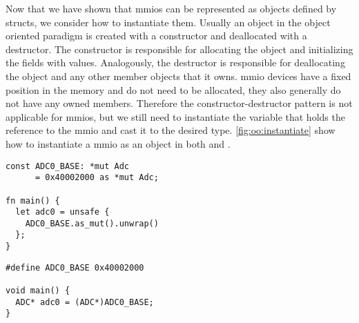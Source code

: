 Now that we have shown that \glspl{mmio} can be represented as objects defined by structs, we consider how to instantiate them.
Usually an object in the object oriented paradigm is created with a constructor and deallocated with a destructor.
The constructor is responsible for allocating the object and initializing the fields with values.
Analogously, the destructor is responsible for deallocating the object and any other member objects that it owns.
\gls{mmio} devices have a fixed position in the memory and do not need to be allocated, they also generally do not have any owned members.
Therefore the constructor-destructor pattern is not applicable for \gls{mmio}s, but we still need to instantiate the variable that holds the reference to the \gls{mmio} and cast it to the desired type.
\autoref{fig:oo:instantiate} show how to instantiate a \gls{mmio} as an object in both {\C} and {\rust}.

\begin{listing}[H]
  \begin{minipage}{0.47\textwidth}
  \begin{listing}
    \begin{verbatim}
const ADC0_BASE: *mut Adc
      = 0x40002000 as *mut Adc;

fn main() {
  let adc0 = unsafe {
    ADC0_BASE.as_mut().unwrap()
  };
}
    \end{verbatim}
    \caption{Rust}
  \end{listing}
  \end{minipage}
  \hfill
  \begin{minipage}{0.47\textwidth}
  \begin{listing}
    \begin{verbatim}
#define ADC0_BASE 0x40002000

void main() {
  ADC* adc0 = (ADC*)ADC0_BASE;
}
    \end{verbatim}
    \caption{C}
  \end{listing}
  \end{minipage}
  \caption{Instantiating a \glspl{mmio}}
  \label{fig:oo:instantiate}
\end{listing}

